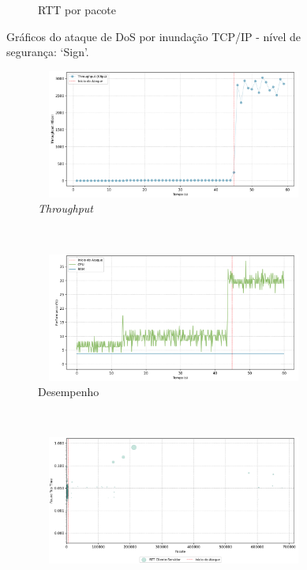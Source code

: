 \begin{apendicesenv}
\begin{figure}[htbp!]
\begin{subfigure}[t]{0.5\textwidth}
        \caption{RTT por pacote}
    \end{subfigure}%
    \label{fig:1-dos_hping3}
    \caption{Gráficos do ataque de DoS por inundação TCP/IP - nível de segurança: `Sign'.}
\end{figure}

\begin{figure}[htbp!]
    \centering
    \begin{subfigure}[t]{0.5\textwidth}
        \centering
        \includegraphics[width=1\textwidth, height=120pt]{USPSC-img/output/cropped/2-dos_hping3-tput.png}
        \caption{\textit{Throughput}}
    \end{subfigure}%
    ~ 
    \begin{subfigure}[t]{0.5\textwidth}
        \centering
        \includegraphics[width=1\textwidth, height=120pt]{USPSC-img/output/cropped/2-dos_hping3-perf.png}
        \caption{Desempenho}
    \end{subfigure}%
    \\
    \begin{subfigure}[t]{0.5\textwidth}
        \centering
        \includegraphics[width=1\textwidth, height=120pt]{USPSC-img/output/cropped/2-dos_hping3-rttp.png}

\end{subfigure}
\end{figure}
\end{apendicesenv}
